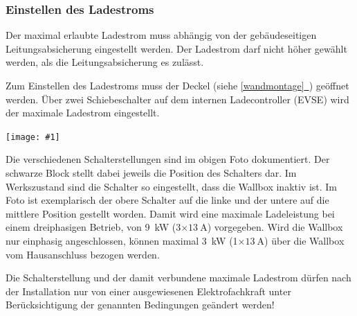 \documentclass[a4paper,10pt]{article}
\newcommand{\hint}[1]{\begin{tcolorbox}[colback=boxgray,colframe=black,coltext=
white,title=Hinweis,left*=2mm,right*=2mm,boxsep=1mm,bottom=1mm,top=1mm]#1\end{tcolorbox}}
\newcommand{\gfx}[1]{\texttt{[image: \#1]}}
\newcommand*{\fullref}[1]{\hyperref[{#1}]{\ref*{#1}~\nameref*{#1}}}
\begin{document}
\begin{multicols*}{2}
	\subsubsection{Einstellen des Ladestroms}\label{ladestrom_schalter}
	Der maximal erlaubte Ladestrom muss abhängig von der gebäudeseitigen
	Leitungsabsicherung eingestellt werden. Der Ladestrom darf nicht höher gewählt
	werden, als die Leitungsabsicherung es zulässt.

	Zum Einstellen des Ladestroms muss der Deckel (siehe \fullref{wandmontage})
	geöffnet werden. Über zwei Schiebeschalter auf dem internen Ladecontroller (EVSE) wird der
	maximale Ladestrom eingestellt.

	\gfx{./img_warp2/resized/warp2_current_configure_w_caption_600}

	Die verschiedenen Schalterstellungen sind im obigen Foto dokumentiert.
	Der schwarze Block stellt dabei jeweils die Position
	des Schalters dar. Im Werkszustand sind die Schalter so eingestellt,
	dass die Wallbox inaktiv ist. Im Foto ist exemplarisch der obere
	Schalter auf die linke und der untere auf die mittlere Position gestellt
	worden. Damit wird eine maximale Ladeleistung bei einem dreiphasigen
	Betrieb, von \SI{9}{\kilo\watt} (3$\times\SI{13}{\ampere}$) vorgegeben.
	Wird die Wallbox nur einphasig angeschlossen, können maximal
	\SI{3}{\kilo\watt} (1$\times\SI{13}{\ampere}$) über die Wallbox vom Hausanschluss
	bezogen werden.

	\hint{Die Schalterstellung und der damit verbundene maximale Ladestrom dürfen nach der
	      Installation nur von einer ausgewiesenen Elektrofachkraft unter
	      Berücksichtigung der genannten Bedingungen geändert werden!}


\end{multicols*}
\end{document}
